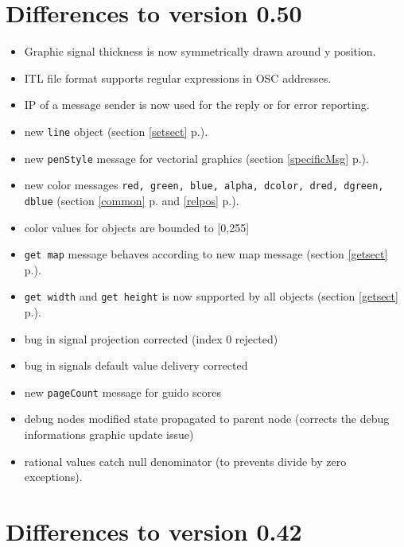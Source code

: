 \documentclass[a4paper,twoside]{report}
\newcommand{\sublevel}[1]	{\section{#1}}
\newcommand{\fullref}[1]	{\ref{#1} p.\pageref{#1}}
\newcommand{\OSC}[1]		{\texttt{#1}}
\begin{document}
\sublevel{Differences to version 0.50}
\begin{itemize}
\item Graphic signal thickness is now symmetrically drawn around y position.
\item ITL file format supports regular expressions in OSC addresses.
\item IP of a message sender is now used for the reply or for error reporting.
\item new \OSC{line} object (section \fullref{setsect}).
\item new \OSC{penStyle} message for vectorial graphics (section \fullref{specificMsg}).
\item new color messages \OSC{red, green, blue, alpha, dcolor, dred, dgreen, dblue} (section \fullref{common} and  \fullref{relpos}).
\item color values for objects are bounded to [0,255]
\item \OSC{get map} message behaves according to new map message (section \fullref{getsect}).
\item \OSC{get width} and  \OSC{get height} is now supported by all objects (section \fullref{getsect}).
\item  bug in signal projection corrected (index 0 rejected)
\item  bug in signals default value delivery corrected
\item  new \OSC{pageCount} message for guido scores
\item  debug nodes modified state propagated to parent node (corrects the debug informations graphic update issue)
\item rational values catch null denominator (to prevents divide by zero exceptions).

\end{itemize}

\sublevel{Differences to version 0.42}
\end{document}
